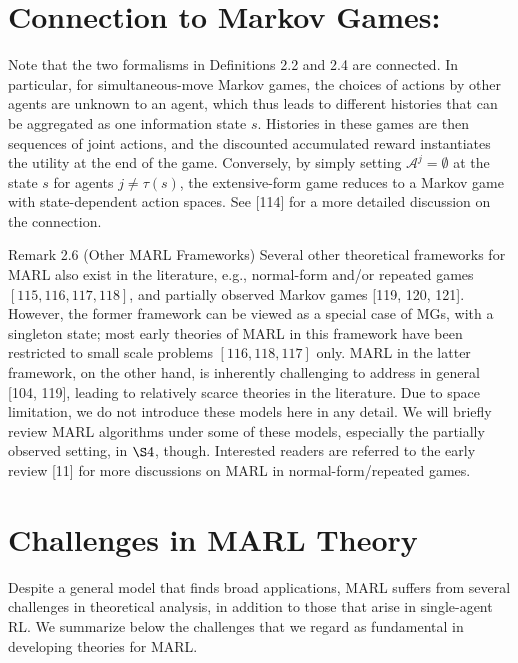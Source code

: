 \documentclass[10pt]{article}
\begin{document}
\section{Connection to Markov Games:}
Note that the two formalisms in Definitions 2.2 and 2.4 are connected. In particular, for simultaneous-move Markov games, the choices of actions by other agents are unknown to an agent, which thus leads to different histories that can be aggregated as one information state $s$. Histories in these games are then sequences of joint actions, and the discounted accumulated reward instantiates the utility at the end of the game. Conversely, by simply setting $\mathcal{A}^{j}=\emptyset$ at the state $s$ for agents $j \neq \tau(s)$, the extensive-form game reduces to a Markov game with state-dependent action spaces. See [114] for a more detailed discussion on the connection.

Remark 2.6 (Other MARL Frameworks) Several other theoretical frameworks for MARL also exist in the literature, e.g., normal-form and/or repeated games $[115,116,117,118]$, and partially observed Markov games [119, 120, 121]. However, the former framework can be viewed as a special case of MGs, with a singleton state; most early theories of MARL in this framework have been restricted to small scale problems $[116,118,117]$ only. MARL in the latter framework, on the other hand, is inherently challenging to address in general [104, 119], leading to relatively scarce theories in the literature. Due to space limitation, we do not introduce these models here in any detail. We will briefly review MARL algorithms under some of these models, especially the partially observed setting, in $\S 4$, though. Interested readers are referred to the early review [11] for more discussions on MARL in normal-form/repeated games.

\section{Challenges in MARL Theory}
Despite a general model that finds broad applications, MARL suffers from several challenges in theoretical analysis, in addition to those that arise in single-agent RL. We summarize below the challenges that we regard as fundamental in developing theories for MARL.
\end{document}
